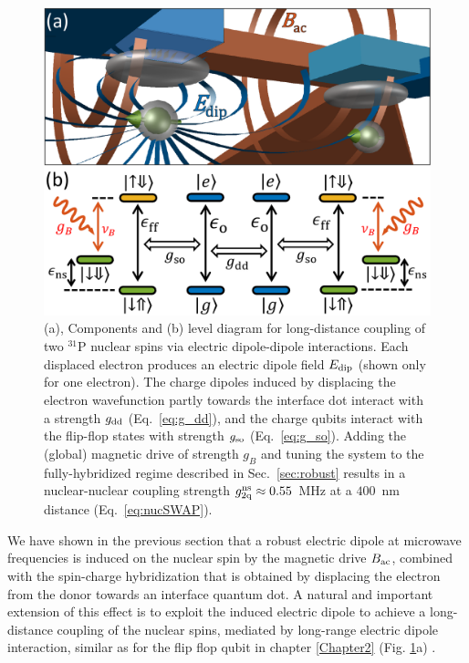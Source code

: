 \begin{figure}
\centering
\includegraphics[width=\columnwidth]{fig5_2-qubit_nuc}
\caption{
(a), Components and (b) level diagram for long-distance coupling of two $^{31}$P nuclear spins via electric dipole-dipole interactions. Each displaced electron produces an electric dipole field $E_{\rm dip}$ (shown only for one electron). The charge dipoles induced by displacing the electron wavefunction partly towards the interface dot interact with a strength $g_{\rm dd}$ (Eq.~\ref{eq:g_dd}), and the charge qubits interact with the flip-flop states with strength $g_{\rm so}$ (Eq.~\ref{eq:g_so}). Adding the (global) magnetic drive of strength $g_B$ and tuning the system to the fully-hybridized regime described in Sec.~\ref{sec:robust} results in a nuclear-nuclear coupling strength $g_{\rm 2q}^{\rm ns} \approx 0.55$~MHz at a $400$~nm distance (Eq.~\ref{eq:nucSWAP}).
}
\label{fig:2-qubit_nuc}
\end{figure}

We have shown in the previous section that a robust electric dipole at microwave frequencies is induced on the nuclear spin by the magnetic drive $B_{\rm ac}$, combined with the spin-charge hybridization that is obtained by displacing the electron from the donor towards an interface quantum dot. A natural and important extension of this effect is to exploit the induced electric dipole to achieve a long-distance coupling of the nuclear spins, mediated by long-range electric dipole interaction, similar as for the flip flop qubit in chapter \ref{Chapter2} (Fig. \ref{fig:2-qubit_nuc}a) \cite{Tosi2017}. 

